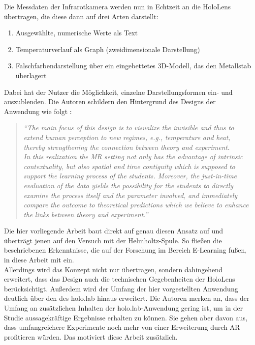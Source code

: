 Die Messdaten der Infrarotkamera werden nun in Echtzeit an die HoloLens übertragen, die diese dann auf drei Arten darstellt:
\begin{enumerate}
	\setlength{\itemsep}{-2pt}
	\item Ausgewählte, numerische Werte als Text
	\item Temperaturverlauf als Graph (zweidimensionale Darstellung)
	\item Falschfarbendarstellung über ein eingebettetes 3D-Modell, das den Metallstab überlagert
\end{enumerate}
Dabei hat der Nutzer die Möglichkeit, einzelne Darstellungsformen ein- und auszublenden. Die Autoren schildern den Hintergrund des Designs der Anwendung wie folgt \Cite{Strzys17}:
\begin{quote}
	\textit{``The main focus of this design is to visualize the invisible and thus to extend human perception to new regimes, e.g., temperature and heat, thereby strengthening the connection between theory and experiment.\\ 
		In this realization the MR setting not only has the advantage of intrinsic contextuality, but also spatial and time contiguity which is supposed to support the learning process of the students. Moreover, the just-in-time evaluation of the data yields the possibility for the students to directly examine the process itself and the parameter involved, and immediately compare the outcome to theoretical predictions which we believe to enhance the links between theory and experiment.''}
\end{quote}

Die hier vorliegende Arbeit baut direkt auf genau diesen Ansatz auf und überträgt jenen auf den Versuch mit der Helmholtz-Spule. So fließen die beschriebenen Erkenntnisse, die auf der Forschung im Bereich E-Learning fußen, in diese Arbeit mit ein.\\

Allerdings wird das Konzept nicht nur übertragen, sondern dahingehend erweitert, dass das Design auch die technischen Gegebenheiten der HoloLens berücksichtigt. Außerdem wird der Umfang der hier vorgestellten Anwendung deutlich über den des holo.lab hinaus erweitert. Die Autoren merken an, dass der Umfang an zusätzlichen Inhalten der holo.lab-Anwendung gering ist, um in der Studie aussagekräftige Ergebnisse erhalten zu können. Sie gehen aber davon aus, dass umfangreichere Experimente noch mehr von einer Erweiterung durch AR profitieren würden. Das motiviert diese Arbeit zusätzlich.\\

